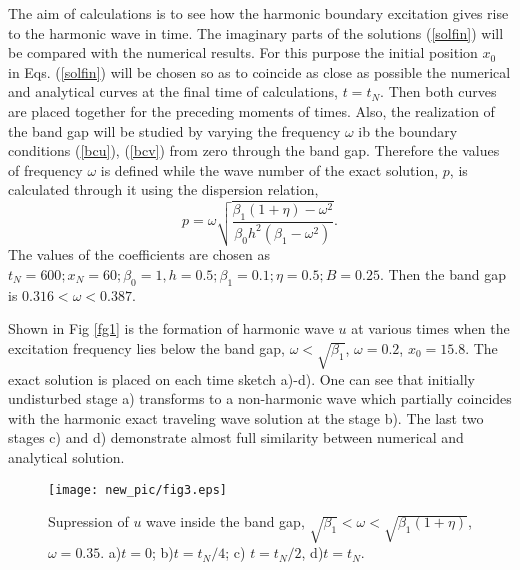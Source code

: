   
The aim of calculations is to see how the harmonic boundary excitation gives rise to the harmonic wave  in time.  The imaginary parts of the solutions (\ref{solfin}) will be compared with the numerical results. For this purpose the initial position $x_0$  in Eqs. (\ref{solfin}) will be chosen so as to coincide as close as possible the numerical and analytical curves at the final time of calculations, $t=t_N$. Then both curves are placed together for the preceding moments of times. Also, the realization of the band gap will be studied by varying the frequency $\omega$ ib the boundary conditions (\ref{bcu}), (\ref{bcv}) from zero through the band gap. Therefore the values of frequency $\omega$ is defined while the wave number of the exact solution, $p$, is calculated through it using the dispersion relation,
\[
p=\omega\sqrt{\frac{\beta_1(1+\eta)-\omega^2}{\beta_0 h^2(\beta_1-\omega^2)}}.
\]
The values of the coefficients are chosen as 
$t_N = 600; x_N = 60;\beta_0=1, h = 0.5; \beta_1 = 0.1; \eta = 0.5;  B=0.25$. Then the band gap is $0.316<\omega<0.387$.

  
Shown in Fig \ref{fg1} is the formation of harmonic wave $u$ at various times when the excitation frequency lies below the band gap, $\omega<\sqrt{\beta_1}$, $\omega=0.2$, $x_0= 15.8$. The exact solution is placed on each time sketch a)-d).  One can see that initially undisturbed stage a) transforms to a non-harmonic wave which partially coincides with the harmonic exact traveling wave solution at the stage b). The last two stages c) and d) demonstrate almost full similarity between numerical and analytical solution.
\begin{figure*}
\begin{center}
\texttt{[image: new\_pic/fig3.eps]}
\end{center}
\caption{Supression  of $u$ wave inside the band gap, $\sqrt{\beta_1}<\omega<\sqrt{\beta_1(1+\eta)}$, $\omega=0.35$. a)$t=0$; b)$ t=t_N/4$; c) $t=t_N/2$, d)$t=t_N$.}
\label{fg3}
  \end{figure*}
  
